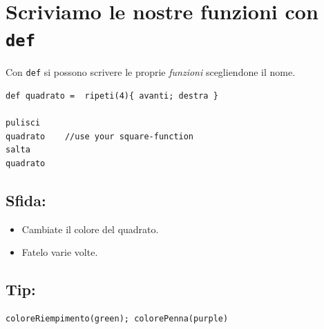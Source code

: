 \chapter{Scriviamo le nostre funzioni con \lstinline{def}}Con \lstinline{def} si possono scrivere le proprie {\it funzioni} scegliendone il nome.

\begin{lstlisting}[basicstyle={\ttfamily\fontsize{20}{24}\selectfont},numbers=none]
def quadrato =  ripeti(4){ avanti; destra }  

pulisci
quadrato    //use your square-function
salta
quadrato
\end{lstlisting}
        
\section*{\color{BrickRed}Sfida:}


\begin{itemize}

\item {Cambiate il colore del quadrato.}
\item {Fatelo varie volte.}

\end{itemize}


\section*{\color{OliveGreen}Tip:}

\begin{lstlisting}[numbers=none]
coloreRiempimento(green); colorePenna(purple)
\end{lstlisting}
        
